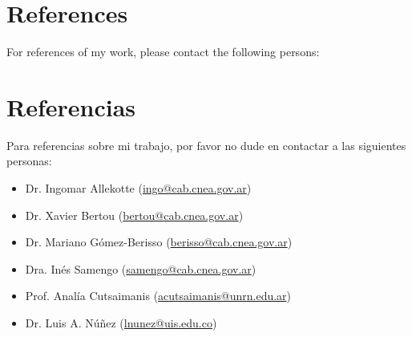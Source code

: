\ifeng
\section*{References}

For references of my work, please contact the following persons:\\
\else
\section*{Referencias}

Para referencias sobre mi trabajo, por favor no dude en contactar a las siguientes personas:\\
\fi
\begin{itemize}
    \item Dr. Ingomar Allekotte (\href{mailto:ingo@cab.cnea.gov.ar}{ingo@cab.cnea.gov.ar})
    \item Dr. Xavier Bertou (\href{mailto:bertou@cab.cnea.gov.ar}{bertou@cab.cnea.gov.ar})
    \item Dr. Mariano Gómez-Berisso (\href{mailto:berisso@cab.cnea.gov.ar}{berisso@cab.cnea.gov.ar})
    \item Dra. Inés Samengo (\href{mailto:samengo@cab.cnea.gov.ar}{samengo@cab.cnea.gov.ar})
    \item Prof. Analía Cutsaimanis (\href{mailto:acutsaimanis@unrn.edu.ar}{acutsaimanis@unrn.edu.ar})
    \item Dr. Luis A. Núñez (\href{mailto:lnunez@uis.edu.co}{lnunez@uis.edu.co})
\end{itemize}